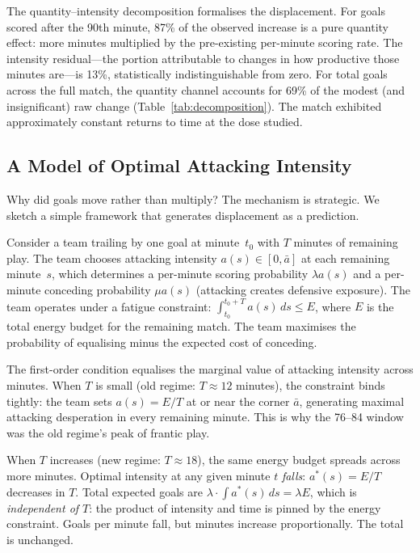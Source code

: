 The quantity--intensity decomposition formalises the displacement. For
goals scored after the 90th minute, 87\% of the observed increase is a
pure quantity effect: more minutes multiplied by the pre-existing
per-minute scoring rate. The intensity residual---the portion
attributable to changes in how productive those minutes are---is 13\%,
statistically indistinguishable from zero. For total goals across the
full match, the quantity channel accounts for 69\% of the modest (and
insignificant) raw change (Table~\ref{tab:decomposition}). The match
exhibited approximately constant returns to time at the dose studied.






\subsection{A Model of Optimal Attacking Intensity}
\label{subsec:model}

Why did goals move rather than multiply? The mechanism is strategic. We
sketch a simple framework that generates displacement as a prediction.

Consider a team trailing by one goal at minute~$t_0$ with $T$ minutes
of remaining play. The team chooses attacking intensity
$a(s) \in [0, \bar{a}]$ at each remaining minute~$s$, which determines
a per-minute scoring probability $\lambda a(s)$ and a per-minute
conceding probability $\mu a(s)$ (attacking creates defensive
exposure). The team operates under a fatigue constraint:
$\int_{t_0}^{t_0 + T} a(s)\, ds \leq E$, where $E$ is the total
energy budget for the remaining match. The team maximises the
probability of equalising minus the expected cost of conceding.

The first-order condition equalises the marginal value of attacking
intensity across minutes. When $T$ is small (old regime:
$T \approx 12$ minutes), the constraint binds tightly: the team sets
$a(s) = E/T$ at or near the corner $\bar{a}$, generating maximal
attacking desperation in every remaining minute. This is why the
76--84 window was the old regime's peak of frantic play.

When $T$ increases (new regime: $T \approx 18$), the same energy
budget spreads across more minutes. Optimal intensity at any given
minute $t$ \textit{falls}: $a^*(s) = E/T$ decreases in $T$. Total
expected goals are $\lambda \cdot \int a^*(s)\, ds = \lambda E$, which
is \textit{independent of $T$}: the product of intensity and time is
pinned by the energy constraint. Goals per minute fall, but minutes
increase proportionally. The total is unchanged.

